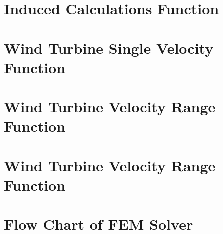\documentclass[11pt]{article}
\begin{document}
\pagebreak

\begin{appendices}

\section{Induced Calculations Function}\label{ap:induced}



\section{Wind Turbine Single Velocity Function}\label{ap:single}


\section{Wind Turbine Velocity Range Function}\label{ap:range}


\section{Wind Turbine Velocity Range Function}\label{ap:optimisation}


\section{Flow Chart of FEM Solver}
%
%
%
%
%
%










\end{appendices}
\end{document}
